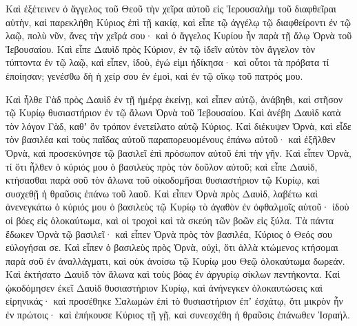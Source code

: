 {Καὶ ἐξέτεινεν ὁ ἄγγελος τοῦ Θεοῦ τὴν χεῖρα αὐτοῦ εἰς Ἱερουσαλὴμ τοῦ διαφθεῖραι αὐτὴν, καὶ παρεκλήθη Κύριος ἐπὶ τῇ κακίᾳ, καὶ εἶπε τῷ ἀγγέλῳ τῷ διαφθείροντι ἐν τῷ λαῷ, πολὺ νῦν, ἄνες τὴν χεῖρά σου· καὶ ὁ ἄγγελος Κυρίου ἦν παρὰ τῇ ἅλῳ Ὀρνὰ τοῦ Ἰεβουσαίου.
Καὶ εἶπε Δαυὶδ πρὸς Κύριον, ἐν τῷ ἰδεῖν αὐτὸν τὸν ἄγγελον τὸν τύπτοντα ἐν τῷ λαῷ, καὶ εἶπεν, ἰδοὺ, ἐγώ εἰμι ἠδίκησα· καὶ οὗτοι τὰ πρόβατα τί ἐποίησαν; γενέσθω δὴ ἡ χείρ σου ἐν ἐμοὶ, καὶ ἐν τῷ οἴκῳ τοῦ πατρός μου.
\par }{\PP {}Καὶ ἦλθε Γὰδ πρὸς Δαυὶδ ἐν τῇ ἡμέρᾳ ἐκείνῃ, καὶ εἶπεν αὐτῷ, ἀνάβηθι, καὶ στῆσον τῷ Κυρίῳ θυσιαστήριον ἐν τῷ ἅλωνι Ὀρνὰ τοῦ Ἰεβουσαίου.
Καὶ ἀνέβη Δαυὶδ κατὰ τὸν λόγον Γὰδ, καθʼ ὃν τρόπον ἐνετείλατο αὐτῷ Κύριος.
Καὶ διέκυψεν Ὀρνὰ, καὶ εἶδε τὸν βασιλέα καὶ τοὺς παῖδας αὐτοῦ παραπορευομένους ἐπάνω αὐτοῦ· καὶ ἐξῆλθεν Ὀρνὰ, καὶ προσεκύνησε τῷ βασιλεῖ ἐπὶ πρόσωπον αὐτοῦ ἐπὶ τὴν γῆν.
Καὶ εἶπεν Ὀρνὰ, τί ὅτι ἦλθεν ὁ κύριός μου ὁ βασιλεὺς πρὸς τὸν δοῦλον αὐτοῦ; καὶ εἶπε Δαυὶδ, κτήσασθαι παρὰ σοῦ τὸν ἅλωνα τοῦ οἰκοδομῆσαι θυσιαστήριον τῷ Κυρίῳ, καὶ συσχεθῇ ἡ θραῦσις ἐπάνω τοῦ λαοῦ.
Καὶ εἶπεν Ὀρνὰ πρὸς Δαυὶδ, λαβέτω καὶ ἀνενεγκάτω ὁ κύριός μου ὁ βασιλεὺς τῷ Κυρίῳ τὸ ἀγαθὸν ἐν ὀφθαλμοῖς αὐτοῦ· ἰδοὺ οἱ βόες εἰς ὁλοκαύτωμα, καὶ οἱ τροχοὶ καὶ τὰ σκεύη τῶν βοῶν εἰς ξύλα.
Τὰ πάντα ἔδωκεν Ὀρνὰ τῷ βασιλεῖ· καὶ εἶπεν Ὀρνὰ πρὸς τὸν βασιλέα, Κύριος ὁ Θεός σου εὐλογήσαι σε.
Καὶ εἶπεν ὁ βασιλεὺς πρὸς Ὀρνὰ, οὐχὶ, ὅτι ἀλλὰ κτώμενος κτήσομαι παρὰ σοῦ ἐν ἀναλλάγματι, καὶ οὐκ ἀνοίσω τῷ Κυρίῳ μου Θεῷ ὁλοκαύτωμα δωρεάν. Καὶ ἐκτήσατο Δαυὶδ τὸν ἅλωνα καὶ τοὺς βόας ἐν ἀργυρίῳ σίκλων πεντήκοντα.
Καὶ ᾠκοδόμησεν ἐκεῖ Δαυὶδ θυσιαστήριον Κυρίῳ, καὶ ἀνήνεγκεν ὁλοκαυτώσεις καὶ εἰρηνικάς· καὶ προσέθηκε Σαλωμὼν ἐπὶ τὸ θυσιαστήριον ἐπʼ ἐσχάτῳ, ὅτι μικρὸν ἦν ἐν πρώτοις· καὶ ἐπήκουσε Κύριος τῇ γῇ, καὶ συνεσχέθη ἡ θραῦσις ἐπάνωθεν Ἰσραήλ.
\par }